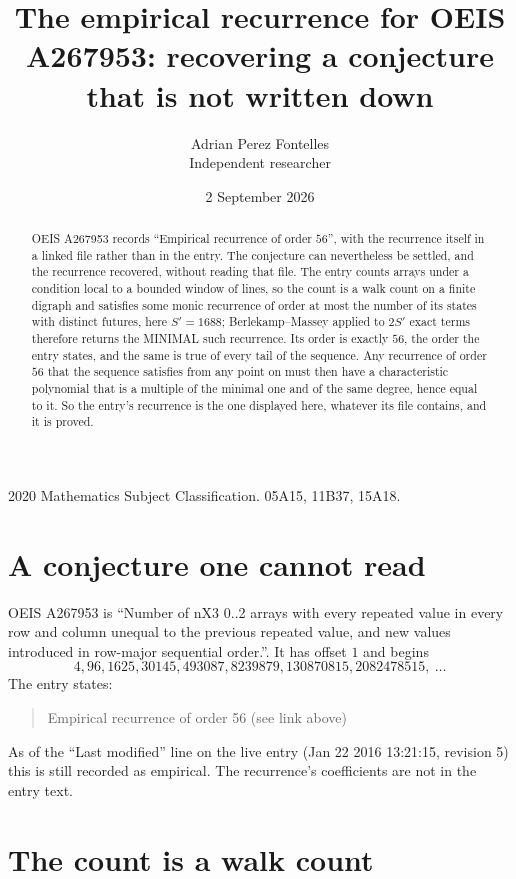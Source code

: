 \documentclass[11pt,a4paper]{article}
\title{The empirical recurrence for OEIS A267953: recovering a conjecture that is not written down}
\author{Adrian Perez Fontelles\\ \small Independent researcher}
\date{2 September 2026}
\theoremstyle{plain}
\theoremstyle{definition}
\begin{document}
\maketitle

\begin{abstract}
OEIS A267953 records ``Empirical recurrence of order $56$'', with the recurrence itself in a
linked file rather than in the entry. The conjecture can nevertheless be settled, and the
recurrence recovered, without reading that file. The entry counts arrays under a condition
local to a bounded window of lines, so the count is a walk count on a finite digraph and
satisfies some monic recurrence of order at most the number of its states with distinct
futures, here $S'=1688$; Berlekamp--Massey applied to $2S'$ exact
terms therefore returns the MINIMAL such recurrence. Its order is exactly $56$, the order
the entry states, and the same is true of every tail of the sequence. Any recurrence of order
$56$ that the sequence satisfies from any point on must then have a characteristic
polynomial that is a multiple of the minimal one and of the same degree, hence equal to it. So
the entry's recurrence is the one displayed here, whatever its file contains, and it is
proved.
\end{abstract}

\noindent\small 2020 Mathematics Subject Classification. 05A15, 11B37, 15A18.\normalsize

\section{A conjecture one cannot read}

OEIS A267953 is ``Number of nX3 0..2 arrays with every repeated value in every row and column unequal to the previous repeated value, and new values introduced in row-major sequential order.''. It has offset $1$ and begins
\[
4, 96, 1625, 30145, 493087, 8239879, 130870815, 2082478515,\ \dots
\]
The entry states:
\begin{quote}
Empirical recurrence of order 56 (see link above)
\end{quote}
As of the ``Last modified'' line on the live entry (Jan 22 2016 13:21:15, revision 5) this is still
recorded as empirical. The recurrence's coefficients are not in the entry text.

\section{The count is a walk count}
\end{document}
